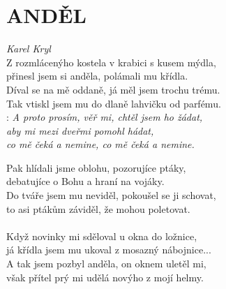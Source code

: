 \section*{\Huge ANDĚL}
\emph{Karel Kryl}\\

Z rozmlácenýho kostela
v krabici s kusem mýdla,\\
přinesl jsem si anděla,
polámali mu křídla.\\
Díval se na mě oddaně,
já měl jsem trochu trému.\\
Tak vtiskl jsem mu do dlaně
lahvičku od parfému.\\

\textregistered:
\emph{A proto prosím, věř mi, chtěl jsem ho žádat,\\
aby mi mezi dveřmi pomohl hádat,\\
co mě čeká \hspace{1cm} a nemine,
co mě čeká \hspace{1cm} a nemine.\\
}

Pak hlídali jsme oblohu, pozorujíce ptáky,\\
debatujíce o Bohu a hraní na vojáky.\\
Do tváře jsem mu neviděl, pokoušel se ji schovat,\\
to asi ptákům záviděl, že mohou poletovat.\\
\textregistered\\

Když novinky mi sděloval u okna do ložnice,\\
já křídla jsem mu ukoval z mosazný nábojnice...\\
A tak jsem pozbyl anděla, on oknem uletěl mi,\\
však přítel prý mi udělá novýho z mojí helmy.\\
\textregistered

\newpage